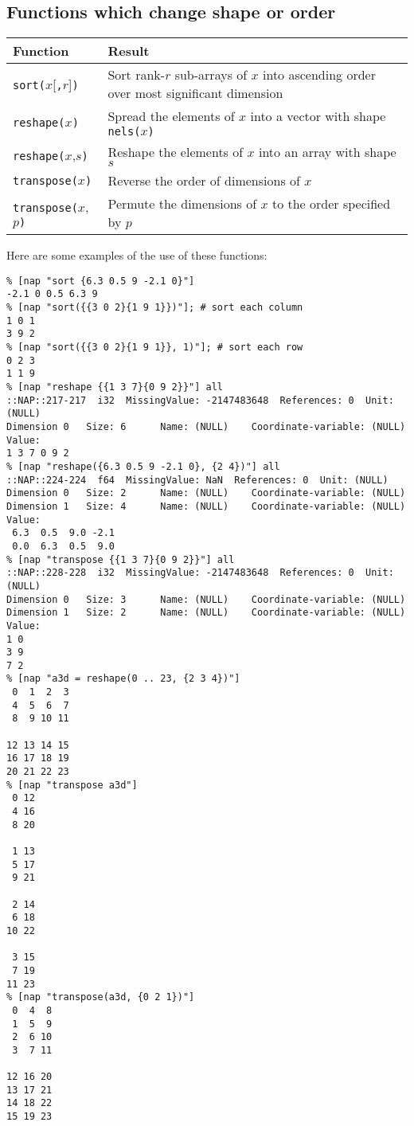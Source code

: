 \subsection{Functions which change shape or order}
    \label{function-change-shape-or-order}

\begin{tabular}{|l|l|}
    \hline 
      \textbf{Function} & \textbf{Result}
    \\
      \hline 
      \hline 
        \texttt{sort(}$x$[\texttt{,}$r$]\texttt{)} & Sort rank-$r$ sub-arrays of $x$ into ascending order over most significant dimension
      \\
      \hline 
        \texttt{reshape(}$x$\texttt{)} & Spread the elements of $x$ into a vector with shape \texttt{nels(}$x$\texttt{)}
      \\
      \hline 
        \texttt{reshape(}$x$,$s$\texttt{)} & Reshape the elements of $x$ into an array with shape $s$
      \\
      \hline 
        \texttt{transpose(}$x$\texttt{)} & Reverse the order of dimensions of $x$
      \\
      \hline 
        \texttt{transpose(}$x$,$p$\texttt{)} & Permute the dimensions of $x$ to the order specified by $p$
      \\
  \hline
\end{tabular}

  \par Here are some examples of the use of these functions:
  \begin{verbatim}
% [nap "sort {6.3 0.5 9 -2.1 0}"]
-2.1 0 0.5 6.3 9
% [nap "sort({{3 0 2}{1 9 1}})"]; # sort each column
1 0 1
3 9 2
% [nap "sort({{3 0 2}{1 9 1}}, 1)"]; # sort each row
0 2 3
1 1 9
% [nap "reshape {{1 3 7}{0 9 2}}"] all
::NAP::217-217  i32  MissingValue: -2147483648  References: 0  Unit: (NULL)
Dimension 0   Size: 6      Name: (NULL)    Coordinate-variable: (NULL)
Value:
1 3 7 0 9 2
% [nap "reshape({6.3 0.5 9 -2.1 0}, {2 4})"] all
::NAP::224-224  f64  MissingValue: NaN  References: 0  Unit: (NULL)
Dimension 0   Size: 2      Name: (NULL)    Coordinate-variable: (NULL)
Dimension 1   Size: 4      Name: (NULL)    Coordinate-variable: (NULL)
Value:
 6.3  0.5  9.0 -2.1
 0.0  6.3  0.5  9.0
% [nap "transpose {{1 3 7}{0 9 2}}"] all
::NAP::228-228  i32  MissingValue: -2147483648  References: 0  Unit: (NULL)
Dimension 0   Size: 3      Name: (NULL)    Coordinate-variable: (NULL)
Dimension 1   Size: 2      Name: (NULL)    Coordinate-variable: (NULL)
Value:
1 0
3 9
7 2
% [nap "a3d = reshape(0 .. 23, {2 3 4})"]
 0  1  2  3
 4  5  6  7
 8  9 10 11

12 13 14 15
16 17 18 19
20 21 22 23
% [nap "transpose a3d"]
 0 12
 4 16
 8 20

 1 13
 5 17
 9 21

 2 14
 6 18
10 22

 3 15
 7 19
11 23
% [nap "transpose(a3d, {0 2 1})"]
 0  4  8
 1  5  9
 2  6 10
 3  7 11

12 16 20
13 17 21
14 18 22
15 19 23
\end{verbatim}


